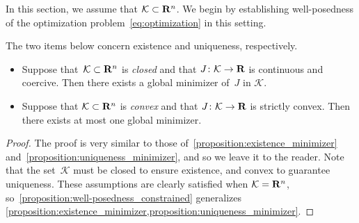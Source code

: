 In this section,
we assume that $\mathcal K \subset \mathbf R^n$.
We begin by establishing well-posedness of the optimization problem~\eqref{eq:optimization} in this setting.

\begin{proposition}
    \label{proposition:well-posedness_constrained}
    The two items below concern existence and uniqueness, respectively.
    \begin{itemize}
        \item
            Suppose that~$\mathcal K \subset \mathbf R^n$ is \emph{closed} and that $J \colon \mathcal K \to \mathbf R$ is continuous and coercive.
            Then there exists a global minimizer of~$J$ in $\mathcal K$.

        \item
            Suppose that $\mathcal K \subset \mathbf R^n$ is \emph{convex} and that $J\colon \mathcal K \to \mathbf R$ is strictly convex.
            Then there exists at most one global minimizer.
    \end{itemize}
\end{proposition}
\begin{proof}
    The proof is very similar to those of~\cref{proposition:existence_minimizer} and~\cref{proposition:uniqueness_minimizer},
    and so we leave it to the reader.
    Note that the set~$\mathcal K$ must be closed to ensure existence,
    and convex to guarantee uniqueness.
    These assumptions are clearly satisfied when $\mathcal K = \mathbf R^n$,
    so~\cref{proposition:well-posedness_constrained} generalizes \cref{proposition:existence_minimizer,proposition:uniqueness_minimizer}.
\end{proof}

